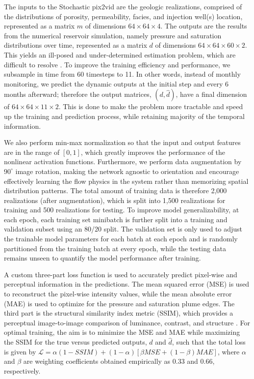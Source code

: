 \documentclass[10pt, twoside]{article}
\begin{document}
The inputs to the Stochastic pix2vid are the geologic realizations, comprised of the distributions of porosity, permeability, facies, and injection well(s) location, represented as a matrix $m$ of dimensions $64\times64\times4$. The outputs are the results from the numerical reservoir simulation, namely pressure and saturation distributions over time, represented as a matrix $d$ of dimensions $64\times64\times60\times2$. This yields an ill-posed and under-determined estimation problem, which are difficult to resolve \cite{tarantola2005inverse, Oliver20081}. To improve the training efficiency and performance, we subsample in time from 60 timesteps to 11. In other words, instead of monthly monitoring, we predict the dynamic outputs at the initial step and every 6 months afterward; therefore the output matrices, $(d, \hat{d})$, have a final dimension of $64\times64\times11\times2$. This is done to make the problem more tractable and speed up the training and prediction process, while retaining majority of the temporal information. 

We also perform min-max normalization so that the input and output features are in the range of $[0,1]$, which greatly improves the performance of the nonlinear activation functions. Furthermore, we perform data augmentation by $90^{\circ}$ image rotation, making the network agnostic to orientation and encourage effectively learning the flow physics in the system rather than memorizing spatial distribution patterns. The total amount of training data is therefore 2,000 realizations (after augmentation), which is split into 1,500 realizations for training and 500 realizations for testing. To improve model generalizability, at each epoch, each training set minibatch is further split into a training and validation subset using an 80/20 split. The validation set is only used to adjust the trainable model parameters for each batch at each epoch and is randomly partitioned from the training batch at every epoch, while the testing data remains unseen to quantify the model performance after training.

A custom three-part loss function is used to accurately predict pixel-wise and perceptual information in the predictions. The mean squared error (MSE) is used to reconstruct the pixel-wise intensity values, while the mean absolute error (MAE) is used to optimize for the pressure and saturation plume edges. The third part is the structural similarity index metric (SSIM), which provides a perceptual image-to-image comparison of luminance, contrast, and structure \cite{Bovik2004}. For optimal training, the aim is to minimize the MSE and MAE while maximizing the SSIM for the true versus predicted outputs, $d$ and $\hat{d}$, such that the total loss is given by $\mathcal{L} = \alpha(1-SSIM) + (1-\alpha)[\beta MSE + (1-\beta) MAE] $, where $\alpha$ and $\beta$ are weighting coefficients obtained empirically as 0.33 and 0.66, respectively.
\end{document}
